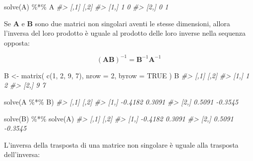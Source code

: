 \documentclass[
  11pt,
]{krantz}
\makeatletter
\newenvironment{Shaded}{\begin{snugshade}}{\end{snugshade}}
\newcommand{\AttributeTok}[1]{\textcolor[rgb]{0.61,0.61,0.61}{#1}}
\newcommand{\CommentTok}[1]{\textcolor[rgb]{0.37,0.37,0.37}{\textit{#1}}}
\newcommand{\ConstantTok}[1]{\textcolor[rgb]{0,0,0}{#1}}
\newcommand{\DecValTok}[1]{\textcolor[rgb]{0.06,0.06,0.06}{#1}}
\newcommand{\FunctionTok}[1]{\textcolor[rgb]{0,0,0}{#1}}
\newcommand{\NormalTok}[1]{#1}
\newcommand{\OtherTok}[1]{\textcolor[rgb]{0.37,0.37,0.37}{#1}}
\newcommand{\SpecialCharTok}[1]{\textcolor[rgb]{0,0,0}{#1}}
\newenvironment{kframe}{%
\medskip{}
\setlength{\fboxsep}{.8em}
 \def\at@end@of@kframe{}%
 \ifinner\ifhmode%
  \def\at@end@of@kframe{\end{minipage}}%
  \begin{minipage}{\columnwidth}%
 \fi\fi%
 \def\FrameCommand##1{\hskip\@totalleftmargin \hskip-\fboxsep
 \colorbox{shadecolor}{##1}\hskip-\fboxsep
     \hskip-\linewidth \hskip-\@totalleftmargin \hskip\columnwidth}%
 \MakeFramed {\advance\hsize-\width
   \@totalleftmargin\z@ \linewidth\hsize
   \@setminipage}}%
 {\par\unskip\endMakeFramed%
 \at@end@of@kframe}
\renewenvironment{Shaded}{\begin{kframe}}{\end{kframe}}
\theoremstyle{definition}
\theoremstyle{definition}
\theoremstyle{definition}
\theoremstyle{definition}
\theoremstyle{remark}
\makeatother
\begin{document}
\begin{Shaded}
\begin{Highlighting}[]
\FunctionTok{solve}\NormalTok{(A) }\SpecialCharTok{\%*\%}\NormalTok{ A}
\CommentTok{\#\textgreater{}      [,1] [,2]}
\CommentTok{\#\textgreater{} [1,]    1    0}
\CommentTok{\#\textgreater{} [2,]    0    1}
\end{Highlighting}
\end{Shaded}

Se \(\boldsymbol{A}\) e \(\boldsymbol{B}\) sono due matrici non singolari aventi le stesse dimensioni, allora l'inversa del loro prodotto è uguale al prodotto delle loro inverse nella sequenza opposta:

\[
(\boldsymbol{AB})^{-1}=\boldsymbol{B}^{-1}\boldsymbol{A}^{-1}
\]

\begin{Shaded}
\begin{Highlighting}[]
\NormalTok{B }\OtherTok{\textless{}{-}} \FunctionTok{matrix}\NormalTok{(}
  \FunctionTok{c}\NormalTok{(}\DecValTok{1}\NormalTok{, }\DecValTok{2}\NormalTok{, }\DecValTok{9}\NormalTok{, }\DecValTok{7}\NormalTok{),}
  \AttributeTok{nrow =} \DecValTok{2}\NormalTok{,}
  \AttributeTok{byrow =} \ConstantTok{TRUE}
\NormalTok{)}
\NormalTok{B}
\CommentTok{\#\textgreater{}      [,1] [,2]}
\CommentTok{\#\textgreater{} [1,]    1    2}
\CommentTok{\#\textgreater{} [2,]    9    7}
\end{Highlighting}
\end{Shaded}

\begin{Shaded}
\begin{Highlighting}[]
\FunctionTok{solve}\NormalTok{(A }\SpecialCharTok{\%*\%}\NormalTok{ B)}
\CommentTok{\#\textgreater{}         [,1]    [,2]}
\CommentTok{\#\textgreater{} [1,] {-}0.4182  0.3091}
\CommentTok{\#\textgreater{} [2,]  0.5091 {-}0.3545}
\end{Highlighting}
\end{Shaded}

\begin{Shaded}
\begin{Highlighting}[]
\FunctionTok{solve}\NormalTok{(B) }\SpecialCharTok{\%*\%} \FunctionTok{solve}\NormalTok{(A)}
\CommentTok{\#\textgreater{}         [,1]    [,2]}
\CommentTok{\#\textgreater{} [1,] {-}0.4182  0.3091}
\CommentTok{\#\textgreater{} [2,]  0.5091 {-}0.3545}
\end{Highlighting}
\end{Shaded}

L'inversa della trasposta di una matrice non singolare è uguale alla trasposta dell'inversa:
\end{document}
